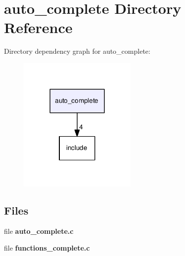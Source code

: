 \section{auto\-\_\-complete Directory Reference}
\label{dir_18dda7dbf49b271626e33a4adee9d618}
Directory dependency graph for auto\-\_\-complete\-:\nopagebreak
\begin{figure}[H]
\begin{center}
\leavevmode
\includegraphics[width=162pt]{dir_18dda7dbf49b271626e33a4adee9d618_dep}
\end{center}
\end{figure}
\subsection*{Files}
\begin{DoxyCompactItemize}
\item 
file {\bf auto\-\_\-complete.\-c}
\item 
file {\bf functions\-\_\-complete.\-c}
\end{DoxyCompactItemize}

